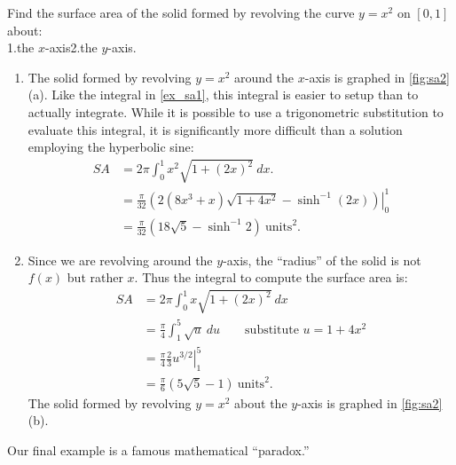 \begin{example}\label{ex_sa2}
Find the surface area of the solid formed by revolving the curve $y=x^2$ on $[0,1]$ about:\\
\null\hfill 1.\quad the $x$-axis\hfill2.\quad the $y$-axis.\hfill\null
\solution
\begin{enumerate}
	\item		The solid formed by revolving $y=x^2$ around the $x$-axis is graphed in \autoref{fig:sa2}(a). Like the integral in \autoref{ex_sa1}, this integral is easier to setup than to actually integrate. While it is possible to use a trigonometric substitution to evaluate this integral, it is significantly more difficult than a solution employing the hyperbolic sine:
\begin{align*}
	SA &= 2\pi\int_0^1 x^2\sqrt{1+(2x)^2}\ dx. \\
	&= \left.\frac{\pi}{32}\left(2(8x^3+x)\sqrt{1+4x^2}-\sinh^{-1}(2x)\right)\right|_0^1\\
	&=\frac{\pi}{32}\left(18\sqrt{5}-\sinh^{-1}2\right)\ \text{units}^2.
\end{align*}

	\item	 Since we are revolving around the $y$-axis, the ``radius'' of the solid is not $f(x)$ but rather $x$. Thus the integral to compute the surface area is:
\begin{align*}
	SA &= 2\pi\int_0^1x\sqrt{1+(2x)^2}\ dx \\
	&=	\frac{\pi}4\int_1^5 \sqrt{u}\ du \qquad\text{substitute $u=1+4x^2$} \\
	&= \left.\frac{\pi}{4}\frac23 u^{3/2}\right|_1^5\\
	&= \frac{\pi}6\left(5\sqrt{5}-1\right)\ \text{units}^2.
\end{align*}
 The solid formed by revolving $y=x^2$ about the $y$-axis is graphed in \autoref{fig:sa2} (b).
\end{enumerate}
\end{example}

Our final example is a famous mathematical ``paradox.''

